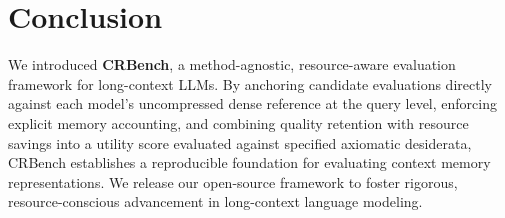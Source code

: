 \documentclass[11pt,a4paper]{article}
\begin{document}
\section{Conclusion}
\label{sec:conclusion}

We introduced \textbf{CRBench}, a method-agnostic, resource-aware evaluation framework for long-context LLMs. By anchoring candidate evaluations directly against each model's uncompressed dense reference at the query level, enforcing explicit memory accounting, and combining quality retention with resource savings into a utility score evaluated against specified axiomatic desiderata, CRBench establishes a reproducible foundation for evaluating context memory representations. We release our open-source framework to foster rigorous, resource-conscious advancement in long-context language modeling.
\end{document}
